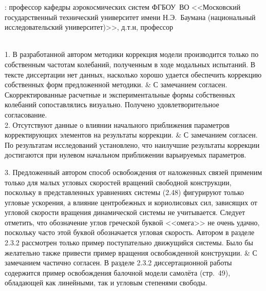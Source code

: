 \begin{frame}
	\beginSkip
	: профессор кафедры аэрокосмических систем ФГБОУ~ВО <<Московский государственный технический университет имени Н.Э.~Баумана (национальный исследовательский университет)>>, д.т.н, профессор \\
	 \\
		\begin{comtblr}{18em}
		1. В разработанной автором методики коррекция модели производится только по собственным частотам колебаний, полученным в ходе модальных испытаний. В тексте диссертации нет данных, насколько хорошо удается обеспечить коррекцию собственных форм предложенной методики.
		&
		С замечанием согласен. Скорректированные расчетные и экспериментальные формы собственных колебаний сопоставлялись визуально. Получено удовлетворительное согласование. \\
		2. Отсутствуют данные о влиянии начального приближения параметров корректирующих элементов на результаты коррекции.
		&
		С замечанием согласен. По результатам исследований установлено, что наилучшие результаты коррекции достигаются при нулевом начальном приближении варьируемых параметров. 
	\end{comtblr}
\end{frame}

\begin{frame}
	\vspace{0.3em}
	\begin{comtblr}{}
		3. Предложенный автором способ освобождения от наложенных связей применим только для малых угловых скоростей вращений свободной конструкции, поскольку в представленных уравнениях системы (2.48) фигурируют только угловые ускорения, а влияние центробежных и кориолисовых сил, зависящих от угловой скорости вращения динамической системы не учитывается. Следует отметить, что обозначение углов греческой буквой <<омега>> не очень удачно, поскольку часто этой буквой обозначается угловая скорость. Автором в разделе 2.3.2 рассмотрен только пример поступательно движущийся системы. Было бы желательно также привести пример вращения освобожденной конструкции.
		&
		С замечанием частично согласен. В разделе 2.3.2 диссертационной работы содержится пример освобождения балочной модели самолёта (стр.~49), обладающей как линейными, так и угловым степенями свободы. \\
	\end{comtblr}
\end{frame}

